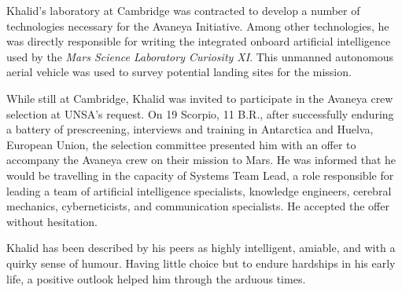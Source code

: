 Khalid's laboratory at Cambridge was contracted to develop a number of technologies necessary for the Avaneya Initiative. Among other technologies, he was directly responsible for writing the integrated onboard artificial intelligence used by the {\it Mars Science Laboratory Curiosity XI}. This unmanned autonomous aerial vehicle was used to survey potential landing sites for the mission.

While still at Cambridge, Khalid was invited to participate in the Avaneya crew selection at UNSA's request. On 19 Scorpio, 11 B.R., after successfully enduring a battery of prescreening, interviews and training in Antarctica and Huelva, European Union, the selection committee presented him with an offer to accompany the Avaneya crew on their mission to Mars. He was informed that he would be travelling in the capacity of Systems Team Lead, a role responsible for leading a team of artificial intelligence specialists, knowledge engineers, cerebral mechanics, cyberneticists, and communication specialists. He accepted the offer without hesitation.

Khalid has been described by his peers as highly intelligent, amiable, and with a quirky sense of humour. Having little choice but to endure hardships in his early life, a positive outlook helped him through the arduous times.

